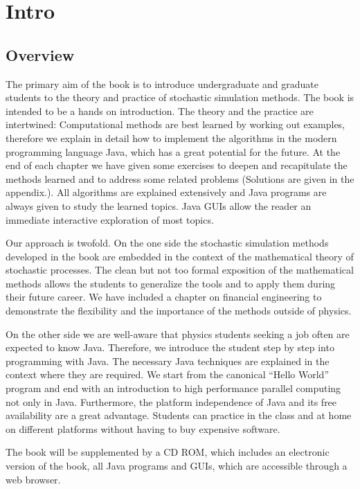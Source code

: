 \documentclass[a4paper]{book}
\begin{document}
\chapter*{Intro}

\section*{Overview}

The primary aim of the book is to introduce undergraduate and graduate 
students to the theory and practice of stochastic simulation methods.
The book is intended to be a  hands on introduction. 
The theory and the practice are intertwined:  Computational methods are 
best learned by working out examples, therefore we explain in detail how to 
implement the algorithms in the modern programming language Java, which has 
a great 
potential for the future. At the end of each chapter we have given
some exercises to deepen and recapitulate the methods learned and to
address some related problems (Solutions are given in the appendix.).
All algorithms are explained extensively and 
Java programs are always given to study the learned topics.
Java GUIs allow the reader an immediate interactive exploration of
most topics.

Our approach is twofold. On the one side the  stochastic simulation
methods developed in the book are embedded in the context of the
mathematical theory of stochastic processes. The clean but not too formal 
exposition of the mathematical methods allows
the students to generalize the tools and to apply them during their future 
career. We have included a chapter on financial engineering to
demonstrate the flexibility and the importance of the methods outside of
physics. 

On the other side we are well-aware that physics students seeking a
job often are expected to know Java.  Therefore, we introduce the
student step by step into programming with Java. The necessary Java
techniques are explained in the context where they are required.
We start from the canonical ``Hello World'' program and end with an 
introduction to high performance parallel computing not only in Java.
Furthermore, the platform independence of Java and its free
availability are  a great advantage. Students can practice in the class 
and at home on different platforms without having to buy expensive
software. 

The book will be supplemented by a CD ROM, which includes an
electronic version of the book, all Java programs and GUIs, which
are accessible through a web browser.
\end{document}
